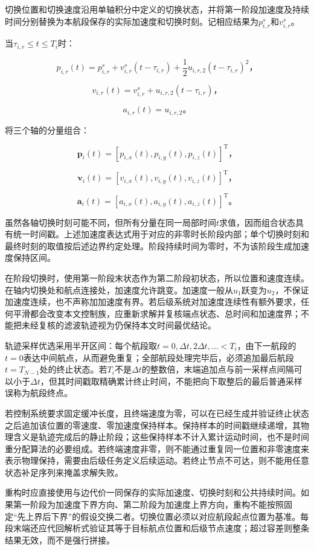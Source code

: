 \documentclass[UTF8,a4paper,12pt,fontset=fandol]{ctexart}
\begin{document}
切换位置和切换速度沿用单轴积分中定义的切换状态，并将第一阶段加速度及持续时间分别替换为本航段保存的实际加速度和切换时刻。记相应结果为\(p_{i,r}^{s}\)和\(v_{i,r}^{s}\)。

当\(\tau_{i,r}\le t\le T_i\)时：

\[
p_{i,r}(t)=p_{i,r}^{s}+v_{i,r}^{s}(t-\tau_{i,r})
+\frac12u_{i,r,2}(t-\tau_{i,r})^2\text{，}
\]

\[
v_{i,r}(t)=v_{i,r}^{s}+u_{i,r,2}(t-\tau_{i,r})\text{，}
\]

\[
a_{i,r}(t)=u_{i,r,2}\text{。}
\]

将三个轴的分量组合：

\[
\mathbf p_i(t)=[p_{i,x}(t),p_{i,y}(t),p_{i,z}(t)]^\mathrm T\text{，}
\]

\[
\mathbf v_i(t)=[v_{i,x}(t),v_{i,y}(t),v_{i,z}(t)]^\mathrm T\text{，}
\]

\[
\mathbf a_i(t)=[a_{i,x}(t),a_{i,y}(t),a_{i,z}(t)]^\mathrm T\text{。}
\]

虽然各轴切换时刻可能不同，但所有分量在同一局部时间\(t\)求值，因而组合状态具有统一时间戳。上述加速度表达式用于对应的非零时长阶段内部；单个切换时刻和最终时刻的取值按后述边界约定处理。阶段持续时间为零时，不为该阶段生成加速度保持区间。

在阶段切换时，使用第一阶段末状态作为第二阶段初状态，所以位置和速度连续。在轴内切换处和航点连接处，加速度允许跳变。加速度一般从\(u_1\)跃变为\(u_2\)，不保证加速度连续，也不声称加加速度有界。若后级系统对加速度连续性有额外要求，任何平滑都会改变本文控制族，应重新求解并复核端点状态、总时间和加速度界；不能把未经复核的滤波轨迹视为仍保持本文时间最优结论。

轨迹采样优选采用半开区间：每个航段取\(t=0,\Delta t,2\Delta t,\ldots<T_i\)，由下一航段的\(t=0\)表达中间航点，从而避免重复；全部航段处理完毕后，必须追加最后航段\(t=T_{N-1}\)处的终止状态。若\(T_i\)不是\(\Delta t\)的整数倍，末端追加点与前一采样点间隔可以小于\(\Delta t\)，但其时间戳取精确累计终止时间，不能把向下取整后的最后普通采样误称为航段终点。

若控制系统要求固定缓冲长度，且终端速度为零，可以在已经生成并验证终止状态之后追加该位置的零速度、零加速度保持样本。保持样本的时间戳继续递增，其物理含义是轨迹完成后的静止阶段；这些保持样本不计入累计运动时间，也不是时间重分配算法的必要组成。若终端速度非零，则不能通过重复同一位置和非零速度来表示物理保持，需要由后级任务定义后续运动。若终止节点不可达，则不能用任意状态补足序列来掩盖求解失败。

重构时应直接使用与边代价一同保存的实际加速度、切换时刻和公共持续时间。如果第一阶段为加速度下界方向、第二阶段为加速度上界方向，重构不能按照固定“先上界后下界”的假设交换二者。切换位置必须以对应航段起点位置为基准。每段末端还应代回解析式验证其等于目标航点位置和后级节点速度；超过容差则整条结果无效，而不是强行拼接。
\end{document}
